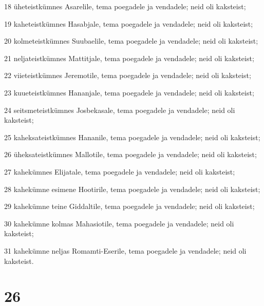 \par 18 üheteistkümnes Asarelile, tema poegadele ja vendadele; neid oli kaksteist;
\par 19 kaheteistkümnes Hasabjale, tema poegadele ja vendadele; neid oli kaksteist;
\par 20 kolmeteistkümnes Suubaelile, tema poegadele ja vendadele; neid oli kaksteist;
\par 21 neljateistkümnes Mattitjale, tema poegadele ja vendadele; neid oli kaksteist;
\par 22 viieteistkümnes Jeremotile, tema poegadele ja vendadele; neid oli kaksteist;
\par 23 kuueteistkümnes Hananjale, tema poegadele ja vendadele; neid oli kaksteist;
\par 24 seitsmeteistkümnes Josbekasale, tema poegadele ja vendadele; neid oli kaksteist;
\par 25 kaheksateistkümnes Hananile, tema poegadele ja vendadele; neid oli kaksteist;
\par 26 üheksateistkümnes Mallotile, tema poegadele ja vendadele; neid oli kaksteist;
\par 27 kahekümnes Elijatale, tema poegadele ja vendadele; neid oli kaksteist;
\par 28 kahekümne esimene Hootirile, tema poegadele ja vendadele; neid oli kaksteist;
\par 29 kahekümne teine Giddaltile, tema poegadele ja vendadele; neid oli kaksteist;
\par 30 kahekümne kolmas Mahasiotile, tema poegadele ja vendadele; neid oli kaksteist;
\par 31 kahekümne neljas Romamti-Eserile, tema poegadele ja vendadele; neid oli kaksteist.

\chapter{26}


